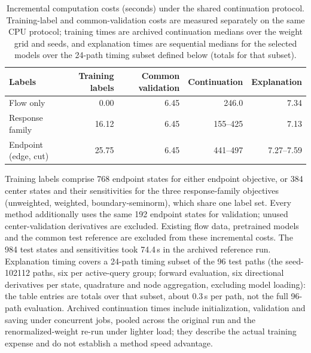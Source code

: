 \begin{table}[t]\centering\footnotesize
\caption{Incremental computation costs (seconds) under the shared
continuation protocol. Training-label and common-validation costs are
measured separately on the same CPU protocol; training times are
archived continuation medians over the weight grid and seeds, and
explanation times are sequential medians for the selected models over
the 24-path timing subset defined below (totals for that subset).}
\label{tab:learning-costs}
\begin{tabular}{lrrrr}\toprule Labels & Training labels & Common validation & Continuation & Explanation\\\midrule
Flow only & 0.00 & 6.45 & 246.0 & 7.34\\
Response family & 16.12 & 6.45 & 155--425 & 7.13\\
Endpoint (edge, cut) & 25.75 & 6.45 & 441--497 & 7.27--7.59\\
\bottomrule\end{tabular}\end{table}
Training labels comprise 768 endpoint states for either endpoint
objective, or 384 center states and their sensitivities for the three
response-family objectives (unweighted, weighted, boundary-seminorm),
which share one label set. Every method additionally uses the same 192
endpoint states for validation; unused center-validation derivatives
are excluded. Existing flow data, pretrained models and the common test
reference are excluded from these incremental costs. The 984 test
states and sensitivities took 74.4\,s in the archived reference run.
Explanation timing covers a 24-path timing subset of the 96 test paths
(the seed-102112 paths, six per active-query group; forward
evaluation, six directional derivatives per state, quadrature and node
aggregation, excluding model loading): the table entries are totals
over that subset, about $0.3$\,s per path, not the full 96-path
evaluation. Archived continuation times include
initialization, validation and saving under concurrent jobs, pooled
across the original run and the renormalized-weight re-run under
lighter load; they describe the actual training expense and do not
establish a method speed advantage.
